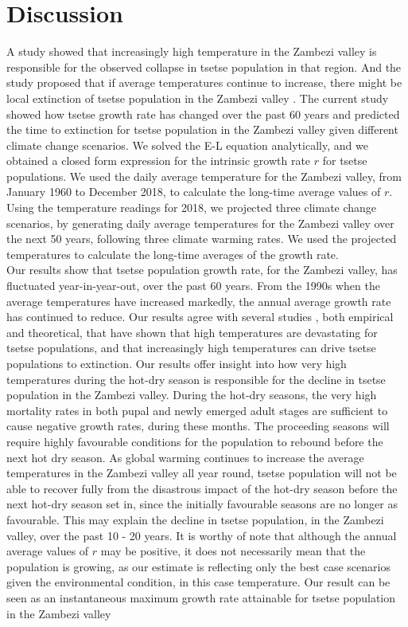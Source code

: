\documentclass[10pt,a4paper]{article}
\begin{document}
\section*{Discussion}

A study showed that increasingly high temperature in the Zambezi valley is responsible for the observed collapse in tsetse population in that region. And the study proposed that if average temperatures continue to increase, there might be local extinction of tsetse population in the Zambezi valley \cite{Lord2018}.  The current study showed how tsetse growth rate has changed over the past 60 years and predicted the time to extinction for tsetse population in the Zambezi valley given different climate change scenarios.  We solved the E-L equation analytically, and we obtained a closed form expression for the intrinsic growth rate $r$ for tsetse populations. We used the daily average temperature for the Zambezi valley, from January 1960 to December 2018, to calculate the long-time average values of $r$. Using the temperature readings for 2018, we projected three climate change scenarios, by generating daily average temperatures for the Zambezi valley over the next 50 years, following three climate warming rates. We used the projected temperatures to calculate the long-time averages of the growth rate.    \\

Our results show that tsetse population growth rate, for the Zambezi valley, has fluctuated year-in-year-out,  over the past 60 years. From the 1990s when the average temperatures have increased markedly, the annual average growth rate has continued to reduce.  Our results agree with several studies \cite{Pagabeleguem2016f,Ackley2017}, both empirical and theoretical, that have shown that high temperatures are devastating for tsetse populations, and that increasingly high temperatures can drive tsetse populations to extinction\cite{Lord2018,Are2019}. Our results offer insight into how very high temperatures during the hot-dry season is responsible for the decline in tsetse population in the Zambezi valley. During the hot-dry seasons, the very high mortality rates in both pupal and newly emerged adult stages are sufficient to cause negative growth rates, during these months. The proceeding seasons will require highly favourable conditions for the population to rebound before the next hot dry season.  As global warming continues to increase the average temperatures in the Zambezi valley all year round, tsetse population will not be able to recover fully from the disastrous impact of the hot-dry season before the next hot-dry season set in, since the initially favourable seasons are no longer as favourable. This may explain the decline in tsetse population, in the Zambezi valley, over the past 10 - 20 years. It is worthy of note that although the annual average values of $r$ may be positive, it does not necessarily mean that the population is growing, as our estimate is reflecting only the best case scenarios given the environmental condition, in this case temperature. Our result can be seen as an instantaneous  maximum growth rate attainable for tsetse population in the Zambezi valley \\
\end{document}
